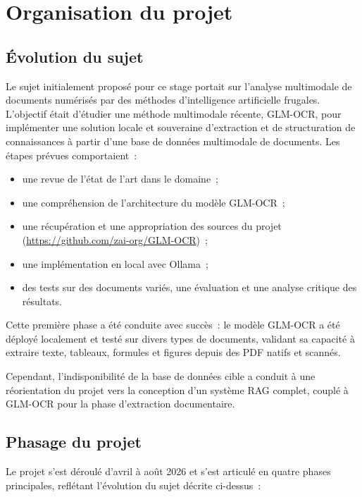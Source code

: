 \documentclass[11pt,a4paper]{article}
\begin{document}
\section{Organisation du projet}
\label{sec:organisation}

\subsection{Évolution du sujet}
\label{sec:evolution-sujet}

Le sujet initialement proposé pour ce stage portait sur l'analyse multimodale de documents numérisés par des méthodes d'intelligence artificielle frugales. L'objectif était d'étudier une méthode multimodale récente, GLM-OCR, pour implémenter une solution locale et souveraine d'extraction et de structuration de connaissances à partir d'une base de données multimodale de documents. Les étapes prévues comportaient~:

\begin{itemize}
  \item une revue de l'état de l'art dans le domaine~;
  \item une compréhension de l'architecture du modèle GLM-OCR~;
  \item une récupération et une appropriation des sources du projet (\url{https://github.com/zai-org/GLM-OCR})~;
  \item une implémentation en local avec Ollama~;
  \item des tests sur des documents variés, une évaluation et une analyse critique des résultats.
\end{itemize}

Cette première phase a été conduite avec succès~: le modèle GLM-OCR a été déployé localement et testé sur divers types de documents, validant sa capacité à extraire texte, tableaux, formules et figures depuis des PDF natifs et scannés.

Cependant, l'indisponibilité de la base de données cible a conduit à une réorientation du projet vers la conception d'un système RAG complet, couplé à GLM-OCR pour la phase d'extraction documentaire.

\subsection{Phasage du projet}

Le projet s'est déroulé d'avril à août 2026 et s'est articulé en quatre phases principales, reflétant l'évolution du sujet décrite ci-dessus~:
\end{document}
